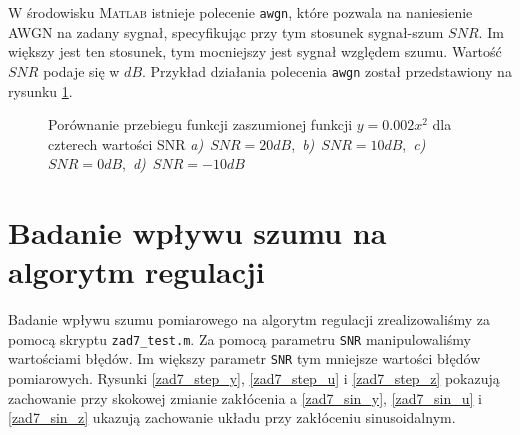 W środowisku \textsc{Matlab} istnieje polecenie \verb+awgn+, które pozwala na naniesienie AWGN 
na zadany sygnał, specyfikując przy tym stosunek sygnał-szum $SNR$. Im większy jest ten stosunek, tym 
mocniejszy jest sygnał względem szumu. Wartość $SNR$ podaje się w $dB$. Przykład działania 
polecenia \verb+awgn+ został przedstawiony na rysunku \ref{zad7_awgn_example}.

\begin{figure}[t]
        \caption{Porównanie przebiegu funkcji zaszumionej funkcji $y = \num{0,002}x^{2}$ dla czterech wartości SNR  
        \mbox{\emph{a)} $SNR = \num{20}dB$, \emph{b)} $SNR = \num{10}dB$, 
        \emph{c)} $SNR = \num{0}dB$, \emph{d)} $SNR = \num{-10}dB$}}
        \label{zad7_awgn_example}
\end{figure}

\section{Badanie wpływu szumu na algorytm regulacji}
\label{zad7_realizacja}

Badanie wpływu szumu pomiarowego na algorytm regulacji zrealizowaliśmy 
za pomocą skryptu \verb+zad7_test.m+. Za pomocą parametru \verb+SNR+ manipulowaliśmy
wartościami błędów. Im większy parametr \verb+SNR+ tym mniejsze wartości błędów pomiarowych. Rysunki 
\ref{zad7_step_y}, \ref{zad7_step_u} i \ref{zad7_step_z} pokazują zachowanie przy skokowej zmianie zakłócenia
a \ref{zad7_sin_y}, \ref{zad7_sin_u} i \ref{zad7_sin_z} ukazują zachowanie układu przy zakłóceniu sinusoidalnym.

